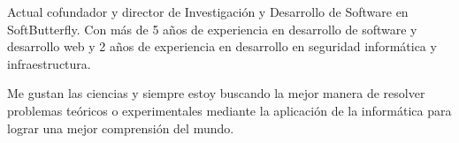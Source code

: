 

\begin{cvparagraph}

Actual cofundador y director de Investigación y Desarrollo de Software en
SoftButterfly. Con más de 5 años de experiencia en desarrollo de software y
desarrollo web y 2 años de experiencia en desarrollo en seguridad informática
y infraestructura.

Me gustan las ciencias y siempre estoy buscando la mejor manera de resolver
problemas teóricos o experimentales mediante la aplicación de la informática
para lograr una mejor comprensión del mundo.
\end{cvparagraph}
